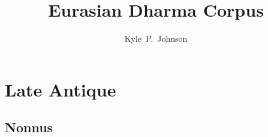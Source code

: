 \documentclass[12pt,letterpaper,twoside,final]{memoir}
\title{Eurasian Dharma Corpus}
\author{Kyle~P.~Johnson}
\begin{document}
\sloppy
{} %
\frontmatter
\hyphenation{}

\SingleSpacing

\dominitoc
\dominilof
\dominilot
\tableofcontents

\mainmatter

\chapter{Late Antique}%
\minitoc

\section{Nonnus}
\end{document}
